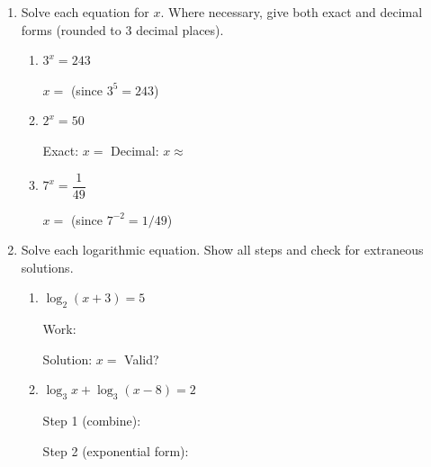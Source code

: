 \documentclass[10pt]{article}
\begin{document}
\namedateperiod

\vspace{0.1in}

\begin{enumerate}[leftmargin=1.8em, itemsep=14pt]

\item Solve each equation for $x$. Where necessary, give both exact and decimal forms
      (rounded to 3 decimal places).

\begin{enumerate}[leftmargin=1.5em, itemsep=8pt, label=\alph*.]
  \item $3^x = 243$

  \vspace{4pt}
  $x = $  \quad (since $3^5 = 243$)

  \item $2^x = 50$

  \vspace{4pt}
  Exact: $x = $  \qquad Decimal: $x \approx $ 

  \item $7^x = \dfrac{1}{49}$

  \vspace{4pt}
  $x = $  \quad (since $7^{-2} = 1/49$)
\end{enumerate}

\item Solve each logarithmic equation. Show all steps and check for extraneous solutions.

\begin{enumerate}[leftmargin=1.5em, itemsep=10pt, label=\alph*.]
  \item $\log_2(x+3) = 5$

  \vspace{4pt}
  Work: 

  \vspace{4pt}
  Solution: $x = $  \qquad Valid? 

  \item $\log_3 x + \log_3(x-8) = 2$

  \vspace{4pt}
  Step 1 (combine): 

  \vspace{4pt}
  Step 2 (exponential form): 


\end{enumerate}
\end{enumerate}
\end{document}
